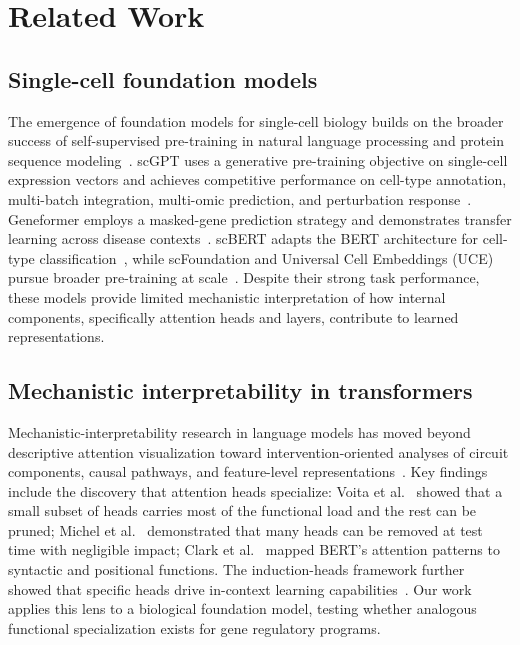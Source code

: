 \documentclass[11pt]{article}
\begin{document}
\section{Related Work}

\subsection{Single-cell foundation models}
The emergence of foundation models for single-cell biology builds on the broader success of self-supervised pre-training in natural language processing and protein sequence modeling~\cite{rives2021esm,lopez2018scvi}. scGPT uses a generative pre-training objective on single-cell expression vectors and achieves competitive performance on cell-type annotation, multi-batch integration, multi-omic prediction, and perturbation response~\cite{cui2024scgpt}. Geneformer employs a masked-gene prediction strategy and demonstrates transfer learning across disease contexts~\cite{theodoris2023geneformer}. scBERT adapts the BERT architecture for cell-type classification~\cite{yang2022scbert}, while scFoundation and Universal Cell Embeddings (UCE) pursue broader pre-training at scale~\cite{hao2024scfoundation,rosen2023uce}. Despite their strong task performance, these models provide limited mechanistic interpretation of how internal components, specifically attention heads and layers, contribute to learned representations.

\subsection{Mechanistic interpretability in transformers}
Mechanistic-interpretability research in language models has moved beyond descriptive attention visualization toward intervention-oriented analyses of circuit components, causal pathways, and feature-level representations~\cite{olah2020zoom,elhage2022toy,vig2020causal,geiger2021causal}. Key findings include the discovery that attention heads specialize: Voita et al.~\cite{voita2019heads} showed that a small subset of heads carries most of the functional load and the rest can be pruned; Michel et al.~\cite{michel2019sixteen} demonstrated that many heads can be removed at test time with negligible impact; Clark et al.~\cite{clark2019bert} mapped BERT's attention patterns to syntactic and positional functions. The induction-heads framework further showed that specific heads drive in-context learning capabilities~\cite{olsson2022induction}. Our work applies this lens to a biological foundation model, testing whether analogous functional specialization exists for gene regulatory programs.
\end{document}
